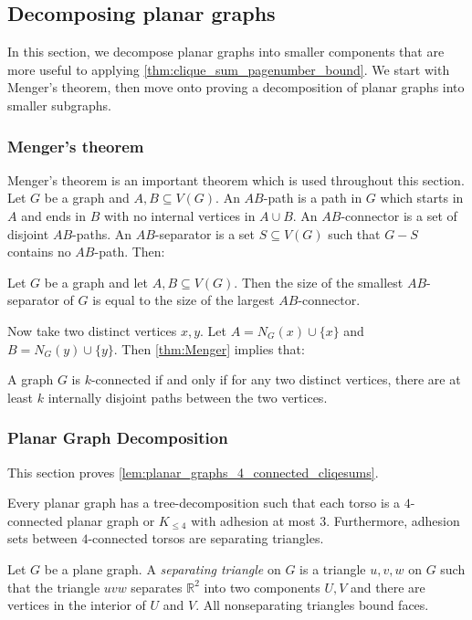 \subsection{Decomposing planar graphs}
In this section, we decompose planar graphs into smaller components that are more useful to applying \cref{thm:clique_sum_pagenumber_bound}. We start with Menger's theorem, then move onto proving a decomposition of planar graphs into smaller subgraphs. 

\subsubsection{Menger's theorem}

Menger's theorem \cite{mengerZurAllgemeinenKurventheorie1927} is an important theorem which is used throughout this section. 
Let \(G\) be a graph and \(A, B \subseteq V(G)\). An \(AB\)-path is a path in \(G\) which starts in \(A\) and ends in \(B\) with no internal vertices in \(A \cup B\). An \(AB\)-connector is a set of disjoint \(AB\)-paths. An \(AB\)-separator is a set \(S \subseteq V(G)\) such that \(G - S\) contains no \(AB\)-path. Then:
\begin{theorem}\label{thm:Menger}
	Let $G$ be a graph and let $A, B \subseteq V(G)$. Then the size of the smallest \(AB\)-separator of \(G\) is equal to the size of the largest \(AB\)-connector.
\end{theorem}
Now take two distinct vertices \(x, y\). Let \(A = N_G(x) \cup \{x\} \) and \(B = N_G(y) \cup \{y\} \). Then \cref{thm:Menger} implies that:
\begin{theorem}\label{thm:Menger_Vertex}
	A graph \(G\) is \(k\)-connected if and only if for any two distinct vertices, there are at least \(k\) internally disjoint paths between the two vertices.
\end{theorem}

\subsubsection{Planar Graph Decomposition}
This section proves \cref{lem:planar_graphs_4_connected_cliqesums}.
\begin{proposition}\label{lem:planar_graphs_4_connected_cliqesums}
	Every planar graph has a tree-decomposition such that each torso is a \(4\)-connected planar graph or $K_{\leq 4}$ with adhesion at most \(3\). Furthermore, adhesion sets between $4$-connected torsos are separating triangles.
\end{proposition}
Let $G$ be a plane graph. A \textit{separating triangle} on $G$ is a triangle $u,v,w$ on $G$ such that the triangle $uvw$ separates $\mathbb{R}^2$ into two components $U, V$ and there are vertices in the interior of $U$ and $V$. All nonseparating triangles bound faces. 

